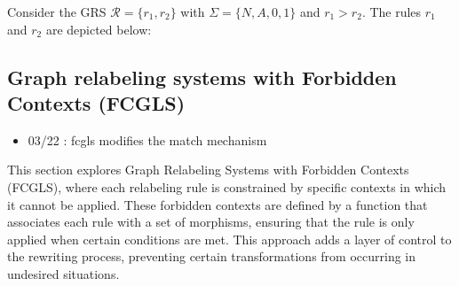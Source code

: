      
    \begin{example}
      \label{example:pgrs_spanning_tree}
      Consider the GRS \(\mathcal{R}= \{r_1,r_2\}\) with \(\Sigma = \{N, A, 0, 1\}\) and \(r_1 > r_2\). The rules \(r_1\) and \(r_2\) are depicted below:
      
      
    \end{example}
     
    \subsection{Graph relabeling systems with Forbidden Contexts (FCGLS)}
    \begin{itemize}
        \item 03/22 : fcgls modifies the match mechanism
      \end{itemize}
      
      This section explores Graph Relabeling Systems with Forbidden Contexts (FCGLS), where each relabeling rule is constrained by specific contexts in which it cannot be applied. These forbidden contexts are defined by a function that associates each rule with a set of morphisms, ensuring that the rule is only applied when certain conditions are met. This approach adds a layer of control to the rewriting process, preventing certain transformations from occurring in undesired situations.
     
